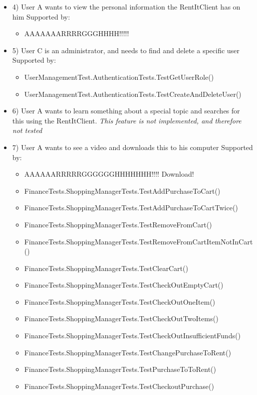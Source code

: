 \begin{itemize}
\item 4)
User A wants to view the personal information the  RentItClient has on him
\newline Supported by:
\begin{itemize}
\item AAAAAAARRRRGGGHHHH!!!!!
\end{itemize}

\item 5)
User C is an administrator, and needs to find and delete a specific user
\newline Supported by:
\begin{itemize}
\item UserManagementTest.AuthenticationTests.TestGetUserRole()
\item UserManagementTest.AuthenticationTests.TestCreateAndDeleteUser()
\end{itemize}

\item 6) 
User A wants to learn something about a special topic and searches for this using the RentItClient. 
\newline \textit{This feature is not implemented, and therefore not tested}

\item 7)
User A wants to see a video and downloads this to his computer
\newline Supported by:
\begin{itemize}
\item AAAAAARRRRRGGGGGGHHHHHHH!!!! Download!
\item FinanceTests.ShoppingManagerTests.TestAddPurchaseToCart()
\item FinanceTests.ShoppingManagerTests.TestAddPurchaseToCartTwice()
\item FinanceTests.ShoppingManagerTests.TestRemoveFromCart()
\item FinanceTests.ShoppingManagerTests.TestRemoveFromCartItemNotInCart()
\item FinanceTests.ShoppingManagerTests.TestClearCart()
\item FinanceTests.ShoppingManagerTests.TestCheckOutEmptyCart()
\item FinanceTests.ShoppingManagerTests.TestCheckOutOneItem()
\item FinanceTests.ShoppingManagerTests.TestCheckOutTwoItems()
\item FinanceTests.ShoppingManagerTests.TestCheckOutInsufficientFunds()
\item FinanceTests.ShoppingManagerTests.TestChangePurchaseToRent()
\item FinanceTests.ShoppingManagerTests.TestPurchaseToToRent()
\item FinanceTests.ShoppingManagerTests.TestCheckoutPurchase()
\end{itemize}


\end{itemize}
